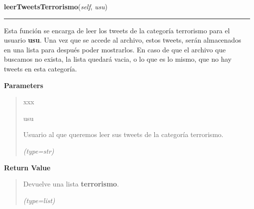 \hspace{.8\funcindent}\begin{boxedminipage}{\funcwidth}

    \raggedright \textbf{leerTweetsTerrorismo}(\textit{self}, \textit{usu})

    \vspace{-1.5ex}

    \rule{\textwidth}{0.5\fboxrule}
\setlength{\parskip}{2ex}
    Esta función se encarga de leer los tweets de la categoría terrorismo 
    para el usuario \textbf{usu}. Una vez que se accede al archivo, estos 
    tweets, serán almacenados en una lista para después poder mostrarlos. 
    En caso de que el archivo que buscamos no exista, la lista quedará 
    vacia, o lo que es lo mismo, que no hay tweets en esta categoría.

\setlength{\parskip}{1ex}
      \textbf{Parameters}
      \vspace{-1ex}

      \begin{quote}
        \begin{Ventry}{xxx}

          \item[usu]

          Usuario al que queremos leer sus tweets de la categoría 
          terrorismo.

            {\it (type=str)}

        \end{Ventry}

      \end{quote}

      \textbf{Return Value}
    \vspace{-1ex}

      \begin{quote}
      Devuelve una lista \textbf{terrorismo}.

      {\it (type=list)}

      \end{quote}

    \end{boxedminipage}

    \label{funcionesTwitter:FuncionesTwitter:obtenerTweetsSc}

    \vspace{0.5ex}

